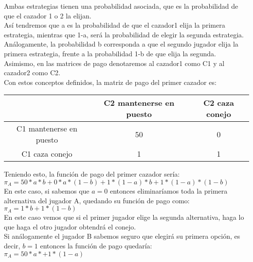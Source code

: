\documentclass[10pt,a4paper]{book}
\begin{document}
Ambas estrategias tienen una probabilidad asociada, que es la probabilidad de que el cazador 1 o 2 la elijan.\\

Así tendremos que a es la probabilidad de que el cazador1 elija la primera estrategia, mientras que 1-a, será la probabilidad de elegir la segunda estrategia.\\
Análogamente, la probabilidad b corresponda a que el segundo jugador elija la primera estrategia, frente a la probabilidad 1-b de que elija la segunda.\\

Asimismo, en las matrices de pago denotaremos al cazador1 como C1 y al cazador2 como C2.\\

Con estos conceptos definidos, la matriz de pago del primer cazador es:\\



\begin{center}
	\begin{tabular}{|c|c|c|}
		\hline
		 & C2 mantenerse en  puesto & C2 caza conejo \\
		\hline
		C1  mantenerse en  puesto & 50 & 0 \\
		\hline
		C1 caza conejo & 1 & 1 \\
		\hline
	\end{tabular}
\end{center}

Teniendo esto, la función de pago del primer cazador sería:\\

$ \pi_A= 50*a*b + 0*a*(1-b) + 1*(1-a)*b + 1*(1-a)*(1-b)$ \\

En este caso, si sabemos que $a=0$ entonces eliminaríamos toda la primera alternativa del jugador A, quedando su función de pago como:\\

$ \pi_A=  1*b + 1*(1-b)$ \\

En este caso vemos que si el primer jugador elige la segunda alternativa, haga lo que haga el otro jugador obtendrá el conejo.\\

Si análogamente el jugador B sabemos seguro que elegirá su primera opción, es decir, $b=1$ entonces la función de pago quedaría:\\

$ \pi_A= 50*a* + 1*(1-a)$ \\
\end{document}
